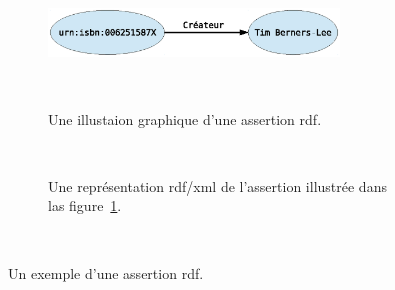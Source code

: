 \begin{figure}[h]
    \centering
    \begin{subfigure}[b]{1\textwidth}
    \centering
    \includegraphics[width=0.85\textwidth]{figs/A/rdf-statement-example-graph.eps}
    \caption{Une illustaion graphique d'une assertion
      \acrshort{rdf}.}~\label{fig:rdf-statement-example-graph}
    \end{subfigure}

    \begin{subfigure}[b]{1\textwidth}
      \centering
      
      \caption{Une représentation \acrshort{rdf/xml} de l'assertion illustrée
        dans las
        figure~\ref{fig:rdf-statement-example-graph}.}~\label{fig:rdf-statement-example-rdf/xml}
    \end{subfigure}

    \caption{Un exemple d'une assertion
      \acrshort{rdf}.}~\label{fig:rdf-statement-example}
\end{figure}
